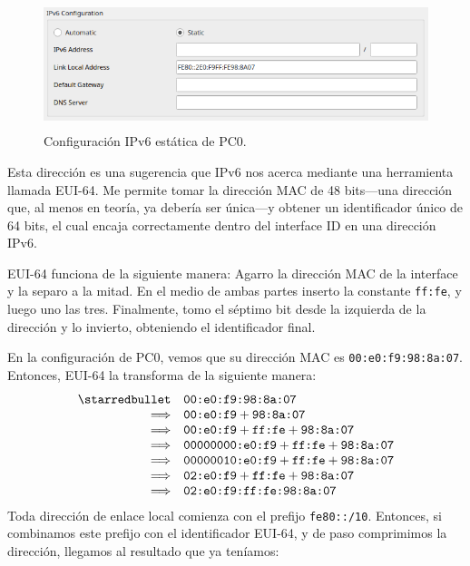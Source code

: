 \documentclass[a4paper,10pt]{corsage}
\newcommand{\ipaddress}[1]{\texttt{#1}}
\newcommand{\macaddress}[1]{\ipaddress{#1}}
\newcommand{\devname}[1]{\textsc{#1}}
\begin{document}
	\begin{figure}
		\centering
		\includegraphics[height=3.75cm]{host-static-conf}
		\caption{Configuración IPv6 estática de \devname{PC0}.}
		\label{fig:host-static-conf}
	\end{figure}

	Esta dirección es una sugerencia que IPv6 nos acerca mediante una herramienta llamada \textsc{EUI-64}.  Me permite tomar la dirección MAC de 48 bits---una dirección que, al menos en teoría, ya debería ser única---y obtener un identificador único de 64 bits, el cual encaja correctamente dentro del interface ID en una dirección IPv6.

	EUI-64 funciona de la siguiente manera:  Agarro la dirección MAC de la interface y la separo a la mitad.  En el medio de ambas partes inserto la constante \ipaddress{ff:fe}, y luego uno las tres.  Finalmente, tomo el séptimo bit desde la izquierda de la dirección y lo invierto, obteniendo el identificador final.

	En la configuración de \devname{PC0}, vemos que su dirección MAC es \macaddress{00:e0:f9:98:8a:07}.  Entonces, EUI-64 la transforma de la siguiente manera:
	\[\begin{array}{rl}
		\text{\starredbullet} & \macaddress{00:e0:f9:98:8a:07} \\
		\Longrightarrow & \macaddress{00:e0:f9} + \macaddress{98:8a:07} \\
		\Longrightarrow & \macaddress{00:e0:f9} + \macaddress{ff:fe} + \macaddress{98:8a:07} \\
		\Longrightarrow & \macaddress{00000000:e0:f9} + \macaddress{ff:fe} + \macaddress{98:8a:07} \\
		\Longrightarrow & \macaddress{00000010:e0:f9} + \macaddress{ff:fe} + \macaddress{98:8a:07} \\
		\Longrightarrow & \macaddress{02:e0:f9} + \macaddress{ff:fe} + \macaddress{98:8a:07} \\
		\Longrightarrow & \macaddress{02:e0:f9:ff:fe:98:8a:07}
	\end{array}\]
	Toda dirección de enlace local comienza con el prefijo \ipaddress{fe80::/10}.  Entonces, si combinamos este prefijo con el identificador EUI-64, y de paso comprimimos la dirección, llegamos al resultado que ya teníamos:
\end{document}
